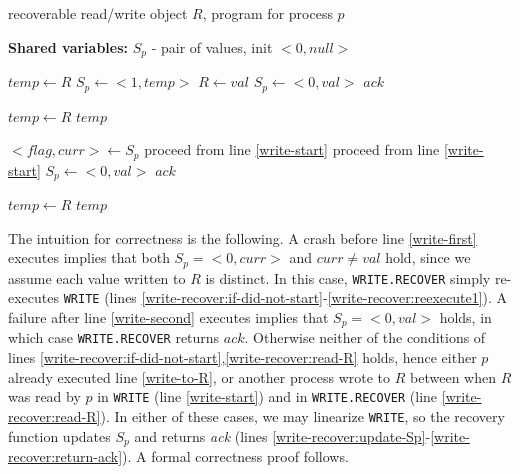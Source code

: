 \begin{algorithm}
	\caption{recoverable read/write object $R$, program for process $p$}
	\label{alg:recoverable-write}
	
	\hspace*{\algorithmicindent} \textbf{Shared variables:}
	$S_p$ - pair of values, init $<0,null>$
	
	\begin{multicols}{2}
	\begin{algorithmic}[1]	
		\State $temp \gets R$ \label{write-start}
		\State $S_p \gets <1,temp>$ \label{write-first}
		\State $R \gets val$ \label{write-to-R}
		\State $S_p \gets <0,val>$ \label{write-second}
		\State \Return $ack$
		\EndProcedure

		 \label{read-first}
        \State $temp \gets R$ \label{read-read-R}
        \State \Return $temp$ \label{read-return}
		\EndProcedure

		
		\columnbreak
		
		\State $<flag, curr> \gets S_p$ \label{write-recover:read-Sp}
		 \label{write-recover:if-did-not-start}
			\State proceed from line \ref{write-start} \label{write-recover:reexecute1}
		 \label{write-recover:read-R}
			\State proceed from line \ref{write-start}
		\EndIf
		\State $S_p \gets <0,val>$ \label{write-recover:update-Sp}
		\State \Return $ack$ \label{write-recover:return-ack}
		\EndProcedure

        \State $temp \gets R$ \label{read-recover-read-R}
        \State \Return $temp$ \label{read-recover-return}
		\EndProcedure \label{read-recover-last}
	\end{algorithmic}
\end{multicols}
\end{algorithm}



The intuition for correctness is the following. A crash before line \ref{write-first} executes implies that both $S_p = {<}0,curr{>}$ and $curr \neq val$ hold, since we assume each value written to $R$ is distinct. In this case, \texttt{WRITE.RECOVER} simply re-executes \texttt{WRITE} (lines \ref{write-recover:if-did-not-start}-\ref{write-recover:reexecute1}). A failure after line \ref{write-second} executes implies that $S_p={<}0,val{>}$ holds, in which case \texttt{WRITE.RECOVER} returns $ack$. Otherwise neither of the conditions of lines \ref{write-recover:if-did-not-start},\ref{write-recover:read-R} holds, hence either $p$ already executed line \ref{write-to-R}, or another process wrote to $R$ between when $R$ was read by $p$ in \texttt{WRITE} (line \ref{write-start}) and in \texttt{WRITE.RECOVER} (line \ref{write-recover:read-R}). In either of these cases, we may linearize \texttt{WRITE}, so the recovery function updates $S_p$ and returns \emph{ack} (lines \ref{write-recover:update-Sp}-\ref{write-recover:return-ack}). A formal correctness proof follows.


